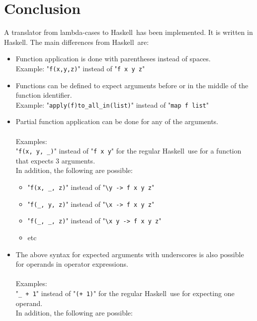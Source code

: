 \documentclass{article}
\def\H{Haskell}
\begin{document}
\newpage
\section{Conclusion}

A translator from lambda-cases to \H\ has been implemented. It is written in
\H. The main differences from \H\ are:

\begin{itemize}

\item
Function application is done with parentheses instead of spaces. \\
Example: "\verb|f(x,y,z)|" instead of "\verb|f x y z|"

\item
Functions can be defined to expect arguments before or in the middle of the
function identifier. \\
Example:
"\verb|apply(f)to_all_in(list)|" instead of "\verb|map f list|"

\item
Partial function application can be done for any of the arguments.
\\\\
Examples:\\
"\verb|f(x, y, _)|" instead of "\verb|f x y|" for the regular \H\ use for
a function that expects 3 arguments.
\\
In addition, the following are possible:

\begin{itemize}

\item
"\verb|f(x, _, z)|" instead of "\verb|\y -> f x y z|"

\item
"\verb|f(_, y, z)|" instead of "\verb|\x -> f x y z|"

\item
"\verb|f(_, _, z)|" instead of "\verb|\x y -> f x y z|"

\item
etc

\end{itemize}

\item
The above syntax for expected arguments with underscores is also possible
for operands in operator expressions.
\\\\
Examples:\\
"\verb|_ + 1|" instead of "\verb|(+ 1)|" for the regular \H\ use for expecting
one operand.
\\
In addition, the following are possible:


\end{itemize}
\end{document}
